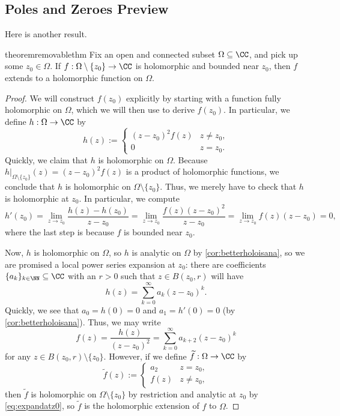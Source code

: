 \subsection{Poles and Zeroes Preview}
Here is another result.
\begin{restatable}{theorem}{removablethm} \label{thm:riemannremove}
	Fix an open and connected subset $\Omega\subseteq\CC$, and pick up some $z_0\in\Omega$. If $f:\Omega\setminus\{z_0\}\to\CC$ is holomorphic and bounded near $z_0$, then $f$ extends to a holomorphic function on $\Omega$.
\end{restatable}
\begin{proof}
	We will construct $f(z_0)$ explicitly by starting with a function fully holomorphic on $\Omega$, which we will then use to derive $f(z_0)$. In particular, we define $h:\Omega\to\CC$ by
	\[h(z):=\begin{cases}
		(z-z_0)^2f(z) & z\ne z_0, \\
		0 & z=z_0.
	\end{cases}\]
	Quickly, we claim that $h$ is holomorphic on $\Omega$. Because $h|_{\Omega\setminus\{z_0\}}(z)=(z-z_0)^2f(z)$ is a product of holomorphic functions, we conclude that $h$ is holomorphic on $\Omega\setminus\{z_0\}$. Thus, we merely have to check that $h$ is holomorphic at $z_0$. In particular, we compute
	\[h'(z_0)=\lim_{z\to z_0}\frac{h(z)-h(z_0)}{z-z_0}=\lim_{z\to z_0}\frac{f(z)(z-z_0)^2}{z-z_0}=\lim_{z\to z_0}f(z)(z-z_0)=0,\]
	where the last step is because $f$ is bounded near $z_0$.

	Now, $h$ is holomorphic on $\Omega$, so $h$ is analytic on $\Omega$ by \autoref{cor:betterholoisana}, so we are promised a local power series expansion at $z_0$: there are coefficients $\{a_k\}_{k\in\NN}\subseteq\CC$ with an $r>0$ such that $z\in B(z_0,r)$ will have
	\[h(z)=\sum_{k=0}^\infty a_k(z-z_0)^k.\]
	Quickly, we see that $a_0=h(0)=0$ and $a_1=h'(0)=0$ (by \autoref{cor:betterholoisana}). Thus, we may write
	\[f(z)=\frac{h(z)}{(z-z_0)^2}=\sum_{k=0}^\infty a_{k+2}(z-z_0)^k\tag{$*$}\label{eq:expandatz0}\]
	for any $z\in B(z_0,r)\setminus\{z_0\}$. However, if we define $\widetilde f:\Omega\to\CC$ by
	\[\widetilde f(z):=\begin{cases}
		a_2 & z=z_0, \\
		f(z) & z\ne z_0,
	\end{cases}\]
	then $\widetilde f$ is holomorphic on $\Omega\setminus\{z_0\}$ by restriction and analytic at $z_0$ by \autoref{eq:expandatz0}, so $\widetilde f$ is the holomorphic extension of $f$ to $\Omega$.
\end{proof}
